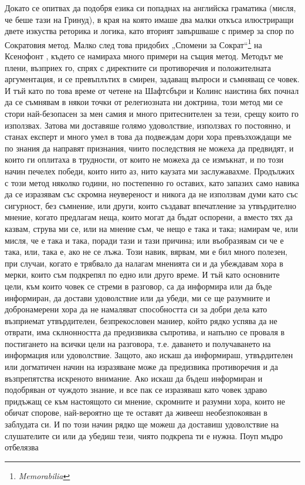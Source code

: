 \documentclass[12pt]{book}
\begin{document}
Докато се опитвах да подобря езика си попаднах на английска граматика (мисля, че беше тази на Гринуд), в края на която имаше два малки откъса илюстриращи двете изкуства реторика и логика, като вторият завършваше с пример за спор по Сократовия метод. Малко след това придобих „Спомени за Сократ“\footnote{\textit{Memorabilia}} на Ксенофонт , където се намираха много примери на същия метод. Методът ме плени, възприех го, спрях с директните си противоречия и положителната аргументация, и се превъплътих в смирен, задаващ въпроси и съмняващ се човек. И тъй като по това време от четене на Шафтсбъри и Колинс наистина бях почнал да се съмнявам в някои точки от релегиозната ни доктрина, този метод ми се стори най-безопасен за мен самия и много притеснителен за тези, срещу които го използвах. Затова ми доставяше голямо удоволствие, използвах го постоянно, и станах експерт и много умел в това да подвеждам дори хора превъзхождащи ме по знания да направят признания, чиито последствия не можеха да предвидят, и които ги оплитаха в трудности, от които не можеха да се измъкнат, и по този начин печелех победи, които нито аз, нито каузата ми заслужавахме. Продължих с този метод няколко години, но постепенно го оставих, като запазих само навика да се изразявам със скромна неувереност и никога да не използвам думи като със сигурност, без съмнение, или други, които създават впечатление за утвърдително мнение, когато предлагам неща, които могат да бъдат оспорени, а вместо тях да казвам, струва ми се, или на мнение съм, че нещо е така и така; намирам че, или мисля, че е така и така, поради тази и тази причина; или въобразявам си че е така, или, така е, ако не се лъжа. Този навик, вярвам, ми е бил много полезен, при случаи, когато е трябвало да налагам мненията си и да убеждавам хора в мерки, които съм подкрепял по едно или друго време. И тъй като основните цели, към които човек се стреми в разговор, са да информира или да бъде информиран, да достави удоволствие или да убеди, ми се ще разумните и добронамерени хора да не намаляват способността си за добри дела като възприемат утвърдителен, безпрекословен маниер, който рядко успява да не отврати, има склнонността да предизвиква съпротива, и напълно се проваля в постигането на всички цели на разговора, т.е. даването и получаването на информация или удоволствие. Защото, ако искаш да информираш, утвърдителен или догматичен начин на изразяване може да предизвика противоречия и да възпрепятства искреното внимание. Ако искаш да бъдеш информиран и подобряван от чуждото знание, и все пак се изразяваш като човек здраво придъжащ се към настоящото си мнение, скромните и разумни хора, които не обичат спорове, най-вероятно ще те оставят да живееш необезпокояван в заблудата си. И по този начин рядко ще можеш да доставиш удоволствие на слушателите си или да убедиш тези, чиято подкрепа ти е нужна. Поуп мъдро отбелязва
\end{document}
